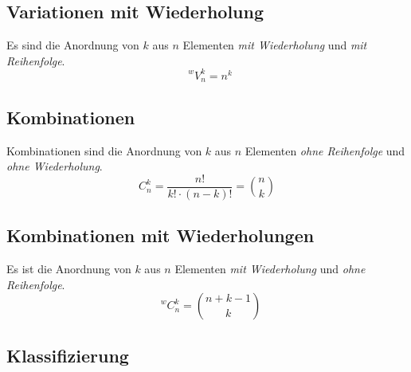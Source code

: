 \subsection{Variationen mit Wiederholung}
Es sind die Anordnung von $k$ aus $n$ Elementen {\em mit Wiederholung} und {\em mit Reihenfolge}.
\begin{equation}
	\phantom{V}^wV_n^k=n^k
\end{equation}

\subsection{Kombinationen}
Kombinationen sind die Anordnung von $k$ aus $n$ Elementen {\em ohne Reihenfolge} und {\em ohne Wiederholung}.
\begin{equation}
	C_n^k=\frac{n!}{k!\cdot(n-k)!}=\binom{n}{k}
\end{equation}

\subsection{Kombinationen mit Wiederholungen}
Es ist die Anordnung von $k$ aus $n$ Elementen {\em mit Wiederholung} und {\em ohne Reihenfolge}.
\begin{equation}
	\phantom{C}^wC_n^k=\binom{n+k-1}{k}
\end{equation}

\subsection{Klassifizierung}
\begin{center}
\end{center}

